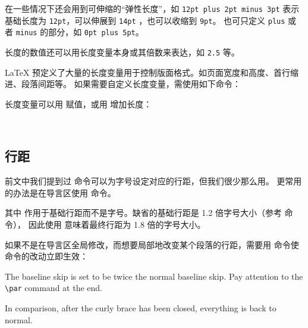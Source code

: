在一些情况下还会用到可伸缩的“弹性长度”，如 \texttt{12pt plus 2pt minus 3pt}
表示基础长度为 \texttt{12pt}，可以伸展到 \texttt{14pt} ，也可以收缩到 \texttt{9pt}。
也可只定义 \texttt{plus} 或者 \texttt{minus} 的部分，如 \texttt{0pt plus 5pt}。

长度的数值还可以用长度变量本身或其倍数来表达，如 \texttt{2.5} 等。

\LaTeX{} 预定义了大量的长度变量用于控制版面格式。如页面宽度和高度、首行缩进、段落间距等。
如果需要自定义长度变量，需使用如下命令：
\begin{command}
\end{command}

长度变量可以用  赋值，或用  增加长度：
\begin{command}
 \\
\end{command}

\subsection{行距}\label{subsec:linespread}

前文中我们提到过  命令可以为字号设定对应的行距，但我们很少那么用。
更常用的办法是在导言区使用  命令。
\begin{command}
\end{command}

其中  作用于基础行距而不是字号。缺省的基础行距是 1.2 倍字号大小（参考  命令），
因此使用  意味着最终行距为 1.8 倍的字号大小。

如果不是在导言区全局修改，而想要局部地改变某个段落的行距，需要用  命令使  命令的改动立即生效：
\begin{example}
{\linespread{2.0}\selectfont
The baseline skip is set to be
twice the normal baseline skip.
Pay attention to the \verb|\par|
command at the end. \par}

In comparison, after the
curly brace has been closed,
everything is back to normal.
\end{example}

